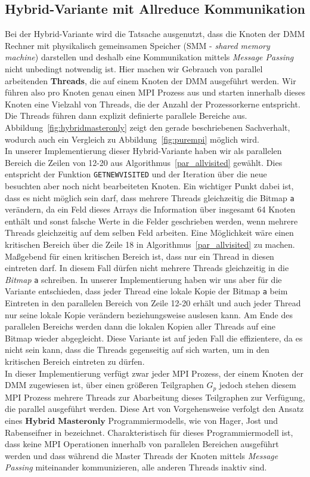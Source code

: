 \documentclass[11pt,a4paper]{article}
\begin{document}
\subsection{Hybrid-Variante mit Allreduce Kommunikation}
Bei der Hybrid-Variante wird die Tatsache ausgenutzt, dass die Knoten der DMM Rechner mit physikalisch gemeinsamen Speicher (SMM - \textit{shared memory machine}) darstellen und deshalb eine Kommunikation mittels \textit{Message Passing} nicht unbedingt notwendig ist. Hier machen wir Gebrauch von parallel arbeitenden \textbf{Threads}, die auf einem Knoten der DMM ausgeführt werden. Wir führen also pro Knoten genau einen MPI Prozess aus und starten innerhalb dieses Knoten eine Vielzahl von Threads, die der Anzahl der Prozessorkerne entspricht. Die Threads führen dann explizit definierte parallele Bereiche aus. Abbildung~\ref{fig:hybridmasteronly} zeigt den gerade beschriebenen Sachverhalt, wodurch auch ein Vergleich zu Abbildung~\ref{fig:purempi} möglich wird.\\
In unserer Implementierung dieser Hybrid-Variante haben wir als parallelen Bereich die Zeilen von 12-20 aus Algorithmus~\ref{par_allvisited} gewählt. Dies entspricht der Funktion \lstinline{GETNEWVISITED} und der Iteration über die neue besuchten aber noch nicht bearbeiteten Knoten. Ein wichtiger Punkt dabei ist, dass es nicht möglich sein darf, dass mehrere Threads gleichzeitig die Bitmap \lstinline{a} verändern, da ein Feld dieses Arrays die Information über insgesamt 64 Knoten enthält und sonst falsche Werte in die Felder geschrieben werden, wenn mehrere Threads gleichzeitig auf dem selben Feld arbeiten. Eine Möglichkeit wäre einen kritischen Bereich über die Zeile 18 in  Algorithmus~\ref{par_allvisited} zu machen. Maßgebend für einen kritischen Bereich ist, dass nur ein Thread in diesen eintreten darf. In diesem Fall dürfen nicht mehrere Threads gleichzeitig in die \textit{Bitmap} \lstinline{a} schreiben. In unserer Implementierung haben wir uns aber für die Variante entschieden, dass jeder Thread eine lokale Kopie der Bitmap \lstinline{a} beim Eintreten in den parallelen Bereich von Zeile 12-20 erhält und auch jeder Thread nur seine lokale Kopie verändern beziehungsweise auslesen kann. Am Ende des parallelen Bereichs werden dann die lokalen Kopien aller Threads auf eine Bitmap wieder abgegleicht. Diese Variante ist auf jeden Fall die effizientere, da es nicht sein kann, dass die Threads gegenseitig auf sich warten, um in den kritischen Bereich eintreten zu dürfen.\\
In dieser Implementierung verfügt zwar jeder MPI Prozess, der einem Knoten der DMM zugewiesen ist, über einen größeren Teilgraphen \(G_{p}\) jedoch stehen diesem MPI Prozess mehrere Threads zur Abarbeitung dieses Teilgraphen zur Verfügung, die parallel ausgeführt werden. Diese Art von Vorgehensweise verfolgt den Ansatz eines \textit{$\textbf{Hybrid Masteronly}$} Programmiermodells, wie von Hager, Jost und Rabenseifner in \cite{hybrid} bezeichnet. Charakteristisch für dieses Programmiermodell ist, dass keine MPI Operationen innerhalb von parallelen Bereichen ausgeführt werden und dass während die Master Threads der Knoten mittels \textit{Message Passing} miteinander kommunizieren, alle anderen Threads inaktiv sind.\\
\end{document}
